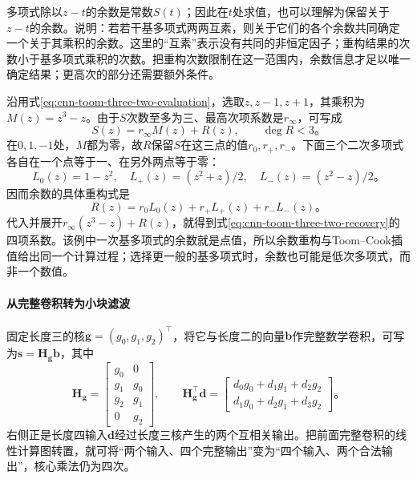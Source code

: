 多项式除以$z-t$的余数是常数$S(t)$；因此在$t$处求值，也可以理解为保留关于$z-t$的余数。说明：若若干基多项式两两互素，则关于它们的各个余数共同确定一个关于其乘积的余数。这里的“互素”表示没有共同的非恒定因子；重构结果的次数小于基多项式乘积的次数。把重构次数限制在这一范围内，余数信息才足以唯一确定结果；更高次的部分还需要额外条件。

沿用式\eqref{eq:cnn-toom-three-two-evaluation}，选取$z,z-1,z+1$，其乘积为$M(z)=z^3-z$。由于$S$次数至多为三、最高次项系数是$r_\infty$，可写成
\begin{equation}
  S(z)=r_\infty M(z)+R(z),\qquad \deg R<3\text{。}
  \label{eq:cnn-winograd-polynomial-remainder}
\end{equation}
在$0,1,-1$处，$M$都为零，故$R$保留$S$在这三点的值$r_0,r_+,r_-$。下面三个二次多项式各自在一个点等于一、在另外两点等于零：
\[
  L_0(z)=1-z^2,\quad
  L_+(z)=(z^2+z)/2,\quad
  L_-(z)=(z^2-z)/2\text{。}
\]
因而余数的具体重构式是
\begin{equation}
  R(z)=r_0L_0(z)+r_+L_+(z)+r_-L_-(z)\text{。}
  \label{eq:cnn-winograd-remainder-reconstruction}
\end{equation}
代入并展开$r_\infty(z^3-z)+R(z)$，就得到式\eqref{eq:cnn-toom-three-two-recovery}的四项系数。该例中一次基多项式的余数就是点值，所以余数重构与Toom--Cook插值给出同一个计算过程；选择更一般的基多项式时，余数也可能是低次多项式，而非一个数值。

\paragraph{从完整卷积转为小块滤波}

固定长度三的核$\bm g=(g_0,g_1,g_2)^\top$，将它与长度二的向量$\bm b$作完整数学卷积，可写为$\bm s=\bm H_{\bm g}\bm b$，其中
\begin{equation}
  \bm H_{\bm g}=\begin{bmatrix}
    g_0&0\\g_1&g_0\\g_2&g_1\\0&g_2
  \end{bmatrix},\qquad
  \bm H_{\bm g}^\top\bm d=
  \begin{bmatrix}
    d_0g_0+d_1g_1+d_2g_2\\
    d_1g_0+d_2g_1+d_3g_2
  \end{bmatrix}\text{。}
  \label{eq:cnn-winograd-filter-transposition}
\end{equation}
右侧正是长度四输入$\bm d$经过长度三核产生的两个互相关输出。把前面完整卷积的线性计算图转置，就可将“两个输入、四个完整输出”变为“四个输入、两个合法输出”，核心乘法仍为四次。

